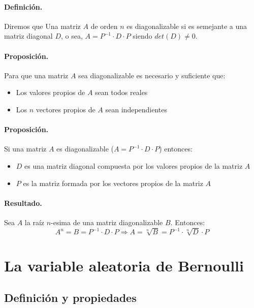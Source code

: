 \paragraph{Definici\'on.} 
Diremos que Una matriz $A$ de orden $n$ es diagonalizable si es semejante a una 
matriz diagonal $D$, o sea, $A = P^{-1} \cdot D \cdot P$ siendo $det(D) \neq 0$.

\paragraph{Proposici\'on.} 
Para que una matriz $A$ sea diagonalizable es necesario y suficiente que:
\begin{itemize}
\item Los valores propios de $A$ sean todos reales
\item Los $n$ vectores propios de $A$ sean independientes
\end{itemize}

\paragraph{Proposici\'on.}
Si una matriz $A$ es diagonalizable ($A = P^{-1} \cdot D \cdot P$) entonces: 
\begin{itemize}
\item $D$ es una matriz diagonal compuesta por los valores propios de la matriz $A$
\item $P$ es la matriz formada por los vectores propios de la matriz $A$
\end{itemize}

\paragraph{Resultado.}
Sea $A$ la ra\'iz $n$-esima de una matriz diagonalizable $B$. Entonces:
\begin{displaymath}
A^n = B = P^{-1} \cdot D \cdot P 
\Longrightarrow  
A = \sqrt[n]{B} = P^{-1} \cdot \sqrt[n]{D} \cdot P
\end{displaymath} 


\section{La variable aleatoria de Bernoulli}

\subsection{Definici\'on y propiedades}

